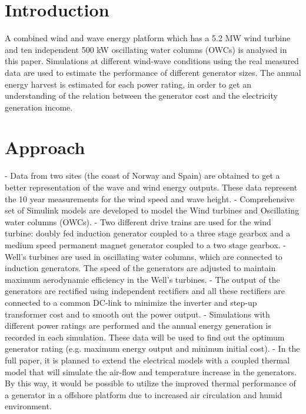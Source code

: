 \documentclass[twoside]{article}
\begin{document}
\begin{multicols}{2} %

\section{Introduction}

A combined wind and wave energy platform which has a 5.2 MW wind turbine and ten independent 500 kW oscillating water columns (OWCs) is analysed in this paper. Simulations at different wind-wave conditions using the real measured data are used to estimate the performance of different generator sizes. The annual energy harvest is estimated for each power rating, in order to get an understanding of the relation between the generator cost and the electricity generation income.


\section{Approach}
- Data from two sites (the coast of Norway and Spain) are obtained to get a better representation of the wave and wind energy outputs. These data represent the 10 year measurements for the wind speed and wave height.
- Comprehensive set of Simulink models are developed to model the Wind turbines and Oscillating water columns (OWCs).
- Two different drive trains are used for the wind turbine: doubly fed induction generator coupled to a three stage gearbox and a medium speed permanent magnet generator coupled to a two stage gearbox.
- Well's turbines are used in oscillating water columns, which are connected to induction generators. The speed of the generators are adjusted to maintain maximum aerodynamic efficiency in the Well's turbines.
- The output of the generators are rectified using independent rectifiers and all these rectifiers are connected to a common DC-link to minimize the inverter and step-up transformer cost and to smooth out the power output.
- Simulations with different power ratings are performed and the annual energy generation is recorded in each simulation. These data will be used to find out the optimum generator rating (e.g. maximum energy output and minimun initial cost).
- In the full paper, it is planned to extend the electrical models with a coupled thermal model that will simulate the air-flow and temperature increase in the generators. By this way, it would be possible to utilize the improved thermal performance of a generator in a offshore platform due to increased air circulation and humid environment.


\end{multicols}
\end{document}
